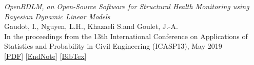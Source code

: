 \begin{description}[style=unboxed]
\noindent \emph{OpenBDLM, an Open-Source Software for Structural Health Monitoring using Bayesian Dynamic Linear Models}\\{\small
            Gaudot, I., Nguyen, L.H., Khazaeli S.and Goulet, J.-A.\\
            In the proceedings from the 13th International Conference on Applications of Statistics and Probability in Civil Engineering (ICASP13), May 2019\\}
      [\href{https://www.polymtl.ca/cgm/jagoulet/Site/Papers/Gaudot_et_al_2019_ICASP13.pdf}{PDF}] [\href{https://www.polymtl.ca/cgm/jagoulet/Site/Papers/Gaudot_et_al_2019_ICASP13.xml}{EndNote}]  [\href{https://www.polymtl.ca/cgm/jagoulet/Site/Papers/Gaudot_et_al_2019_ICASP13.bib}{BibTex}]  \cite{Gaudot2019OpenBDLM}\\[4pt]


\end{description}




